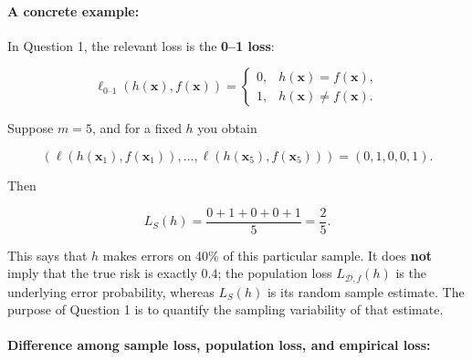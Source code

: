 \documentclass[11pt,a4paper]{article}
\theoremstyle{definition}
\begin{document}
\paragraph{A concrete example:}
In Question 1, the relevant loss is the \textbf{0--1 loss}:

\[
\ell_{0\text{--}1}(h(\boldsymbol{x}), f(\boldsymbol{x})) = \begin{cases} 0, & h(\boldsymbol{x}) = f(\boldsymbol{x}), \\ 1, & h(\boldsymbol{x}) \neq f(\boldsymbol{x}). \end{cases}
\]

Suppose $m = 5$, and for a fixed $h$ you obtain

\[
(\ell(h(\boldsymbol{x}_1), f(\boldsymbol{x}_1)), \dots, \ell(h(\boldsymbol{x}_5), f(\boldsymbol{x}_5))) = (0, 1, 0, 0, 1).
\]

Then

\[
L_S(h) = \frac{0 + 1 + 0 + 0 + 1}{5} = \frac{2}{5}.
\]

This says that $h$ makes errors on 40\% of this particular sample. It does \textbf{not} imply that the true risk is exactly $0.4$; the population loss $L_{\mathcal{D}, f}(h)$ is the underlying error probability, whereas $L_S(h)$ is its random sample estimate. The purpose of Question 1 is to quantify the sampling variability of that estimate.

\paragraph{Difference among sample loss, population loss, and empirical loss:}
\noindent
\end{document}

